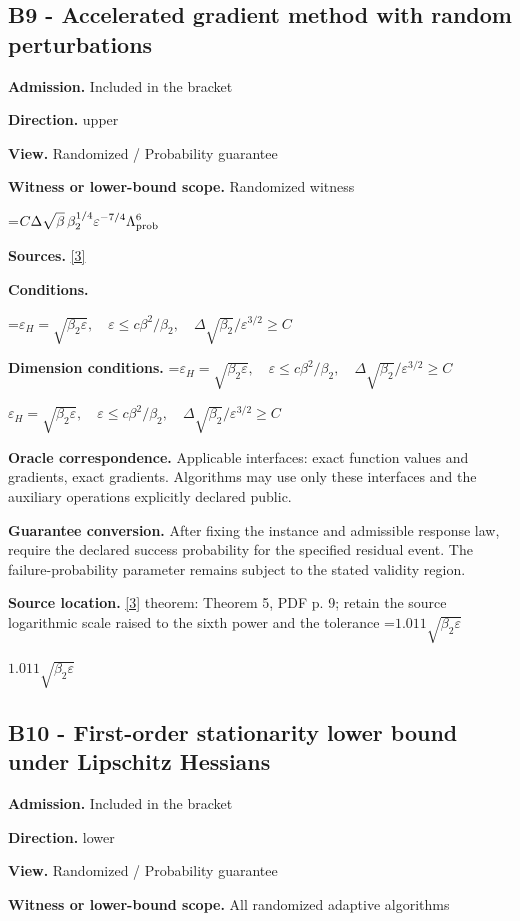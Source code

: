 \documentclass[10pt,a4paper]{article}
\newcommand{\AtlasMath}[1]{\par\begingroup\centering\setbox0=\hbox{$\displaystyle #1$}\ifdim\wd0>1.4\linewidth\typeout{ATLAS WIDE FORMULA: \the\wd0}\fi\ifdim\wd0>\linewidth\resizebox{\linewidth}{!}{\box0}\else\box0\fi\par\endgroup}
\newcommand{\AtlasInlineMath}[1]{\begingroup\setbox0=\hbox{$#1$}\ifdim\wd0>.4\linewidth\endgroup\AtlasMath{#1}\else\endgroup$#1$\fi}
\begin{document}
\subsection{B9 - Accelerated gradient method with random perturbations}
\textbf{Admission.} Included in the bracket

\textbf{Direction.} upper

\textbf{View.} Randomized / Probability guarantee

\textbf{Witness or lower-bound scope.} Randomized witness

\AtlasMath{C\Delta\sqrt\beta\,\beta_2^{1/4}\varepsilon^{-7/4}\Lambda_{\rm prob}^6}
\textbf{Sources.} \href{https://jmlr.org/papers/volume24/22-0522/22-0522.pdf}{[3]}

\textbf{Conditions.} 
\AtlasMath{\varepsilon_H=\sqrt{\beta_2\varepsilon},\quad\varepsilon\le c\beta^2/\beta_2,\quad\Delta\sqrt{\beta_2}/\varepsilon^{3/2}\ge C}


\textbf{Dimension conditions.} \AtlasInlineMath{\varepsilon_H=\sqrt{\beta_2\varepsilon},\quad\varepsilon\le c\beta^2/\beta_2,\quad\Delta\sqrt{\beta_2}/\varepsilon^{3/2}\ge C}

\textbf{Oracle correspondence.} Applicable interfaces: exact function values and gradients, exact gradients. Algorithms may use only these interfaces and the auxiliary operations explicitly declared public.

\textbf{Guarantee conversion.} After fixing the instance and admissible response law, require the declared success probability for the specified residual event. The failure-probability parameter remains subject to the stated validity region.

\textbf{Source location.} \href{https://jmlr.org/papers/volume24/22-0522/22-0522.pdf}{[3]} theorem: Theorem 5, PDF p. 9; retain the source logarithmic scale raised to the sixth power and the tolerance \AtlasInlineMath{1.011\sqrt{\beta_2\varepsilon}}

\subsection{B10 - First-order stationarity lower bound under Lipschitz Hessians}
\textbf{Admission.} Included in the bracket

\textbf{Direction.} lower

\textbf{View.} Randomized / Probability guarantee

\textbf{Witness or lower-bound scope.} All randomized adaptive algorithms
\end{document}
